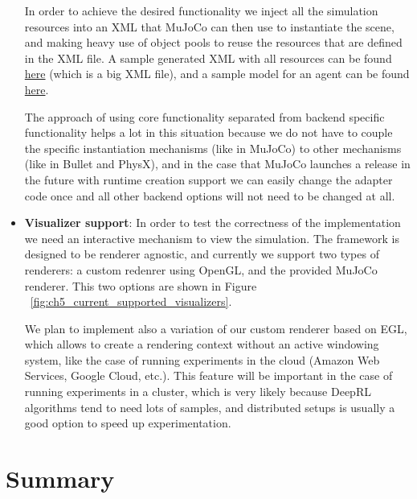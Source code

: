 \begin{itemize}
          In order to achieve the desired functionality we inject all the simulation
          resources into an XML that MuJoCo can then use to instantiate the scene,
          and making heavy use of object pools to reuse the resources that are
          defined in the XML file. A sample generated XML with all resources can
          be found \href{https://github.com/wpumacay/tysocMjc/blob/master/res/xml/workspace.xml}{here}
          (which is a big XML file), and a sample model for an agent can be found
          \href{https://github.com/wpumacay/tysocMjc/blob/master/res/templates/mjcf/walker.xml}{here}.

          The approach of using core functionality separated from backend specific
          functionality helps a lot in this situation because we do not have to
          couple the specific instantiation mechanisms (like in MuJoCo) to other
          mechanisms (like in Bullet and PhysX), and in the case that MuJoCo launches
          a release in the future with runtime creation support we can easily change
          the adapter code once and all other backend options will not need to be
          changed at all.

    \item \textbf{Visualizer support}: In order to test the correctness of the
          implementation we need an interactive mechanism to view the simulation.
          The framework is designed to be renderer agnostic, and currently we support
          two types of renderers: a custom redenrer using OpenGL, and the provided
          MuJoCo renderer. This two options are shown in Figure ~\ref{fig:ch5_current_supported_visualizers}.

          We plan to implement also a variation of our custom renderer based on
          EGL, which allows to create a rendering context without an active windowing
          system, like the case of running experiments in the cloud (Amazon Web Services,
          Google Cloud, etc.). This feature will be important in the case of running
          experiments in a cluster, which is very likely because DeepRL algorithms
          tend to need lots of samples, and distributed setups is usually a good
          option to speed up experimentation.

          \newpage
          \figSupportedVisualizers

\end{itemize}

\section{Summary}

